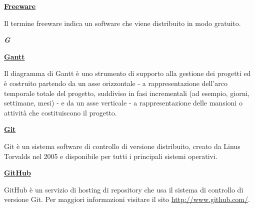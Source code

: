 \bigskip
\begin{addmargin}[0em]{0em}	
	\textbf{\underline{Freeware}} 
\end{addmargin}

\medskip
\begin{addmargin}[5em]{1em}	
Il termine freeware indica un software che viene distribuito in modo gratuito.
\end{addmargin}	

\newpage

\cleardoublepage
{}
{}
\noindent\hrulefill\hspace{4mm}\textbf{\textsl{\Huge{G}}}\hspace{4mm}\hrulefill

\vspace*{2\bigskipamount}

\begin{addmargin}[0em]{0em}	
	\textbf{\underline{Gantt}} 
\end{addmargin}

\medskip
\begin{addmargin}[5em]{1em}	
Il diagramma di Gantt è uno strumento di supporto alla gestione dei progetti ed è costruito partendo da un asse orizzontale - a rappresentazione dell'arco temporale totale del progetto, suddiviso in fasi incrementali (ad esempio, giorni, settimane, mesi) - e da un asse verticale - a rappresentazione delle mansioni o attività che costituiscono il progetto. 
\end{addmargin}	

\bigskip
\begin{addmargin}[0em]{0em}	
	\textbf{\underline{Git}}
\end{addmargin}

\medskip
\begin{addmargin}[5em]{1em}	
Git è un sistema software di controllo di versione distribuito, creato da Linus Torvalds nel 2005 e disponibile per tutti i principali sistemi operativi.
\end{addmargin}

\bigskip
\begin{addmargin}[0em]{0em}	
	\textbf{\underline{GitHub}}
\end{addmargin}

\medskip
\begin{addmargin}[5em]{1em}	
GitHub è un servizio di hosting di repository che usa il sistema di controllo di versione Git.
Per maggiori informazioni visitare il sito \url{http://www.github.com/}.
\end{addmargin}

